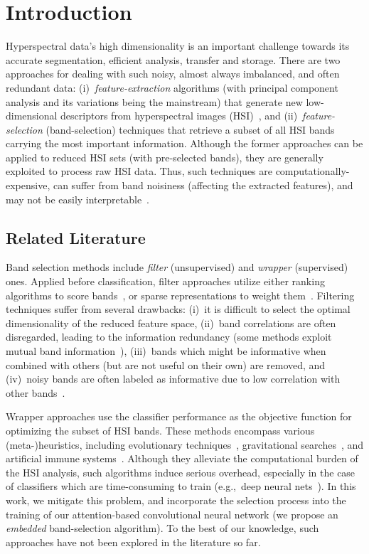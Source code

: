 \documentclass[journal]{IEEEtran}
\begin{document}
\section{Introduction}

Hyperspectral data's high dimensionality is an important challenge towards its accurate segmentation, efficient analysis, transfer and storage. There are two approaches for dealing with such noisy, almost always imbalanced, and often redundant data: (i)~\emph{feature-extraction} algorithms (with principal component analysis and its variations being the mainstream) that generate new low-dimensional descriptors from hyperspectral images (HSI)~\cite{7450160}, and (ii)~\emph{feature-selection} (band-selection) techniques that retrieve a subset of all HSI bands carrying the most important information. Although the former approaches can be applied to reduced HSI sets (with pre-selected bands), they are generally exploited to process raw HSI data. Thus, such techniques are computationally-expensive, can suffer from band noisiness (affecting the extracted features), and may not be easily interpretable~\cite{YANG2017396}.

\subsection{Related Literature}

Band selection methods include \emph{filter} (unsupervised) and \emph{wrapper} (supervised) ones. Applied before classification, filter approaches utilize either ranking algorithms to score bands~\cite{5744136,LI2014241}, or sparse representations to weight them~\cite{DBLP:journals/corr/abs-1802-06983}. Filtering techniques suffer from several drawbacks: (i)~it is difficult to select the optimal dimensionality of the reduced feature space, (ii)~band correlations are often disregarded, leading to the information redundancy (some methods exploit mutual band information~\cite{2040-8986-13-1-015401,1715309,YANG2017396}), (iii)~bands which might be informative when combined with others (but are not useful on their own) are removed, and (iv)~noisy bands are often labeled as informative due to low correlation with other bands~\cite{doi:10.1080/01431161.2017.1302110}.

Wrapper approaches use the classifier performance as the objective function for optimizing the subset of HSI bands. These methods encompass various (meta-)heuristics, including evolutionary techniques~\cite{Wu2010}, gravitational searches~\cite{WANG201857}, and artificial immune systems~\cite{doi:10.1002/9781119242963.ch11}. Although they alleviate the computational burden of the HSI analysis, such algorithms induce serious overhead, especially in the case of classifiers which are time-consuming to train (e.g.,~deep neural nets~\cite{8113688}). In this work, we mitigate this problem, and incorporate the selection process into the training of our attention-based convolutional neural network (we propose an \emph{embedded} band-selection algorithm). To the best of our knowledge, such approaches have not been explored in the literature so far.
\end{document}
